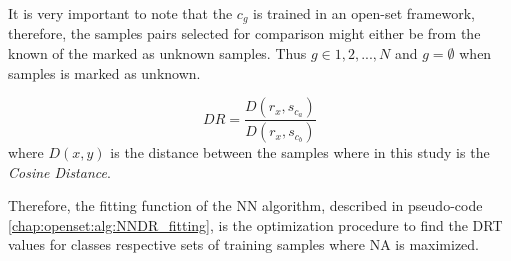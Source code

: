 It is very important to note that the $c_{g}$ is trained in an open-set framework, therefore, the samples pairs selected for comparison might either be from the known of the marked as unknown samples. Thus $g \in {1,2,...,N}$ and $g = \emptyset$ when samples is marked as unknown.

\begin{equation} \label{eq:DR}
    DR = \frac{D(r_{x}, s_{c_{a}})}{D(r_{x}, s_{c_{b}})}
\end{equation}
\noindent
where $D(x,y)$ is the distance between the samples where in this study is the \textit{Cosine Distance}.

Therefore, the fitting function of the NN algorithm, described in pseudo-code \ref{chap:openset:alg:NNDR_fitting}, is the optimization procedure to find the DRT values for classes respective sets of training samples where NA is maximized.

\hfill


